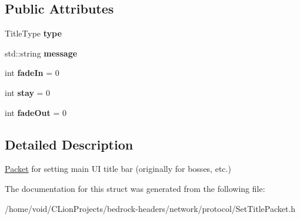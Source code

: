 \subsection*{Public Attributes}
\begin{DoxyCompactItemize}
\item 
\mbox{\label{struct_set_title_packet_a8e070bfe8f9b1b856bbdd45178c73c81}} 
Title\+Type {\bfseries type}
\item 
\mbox{\label{struct_set_title_packet_aec239a2eb87cc1b4674c650a0c1a2b12}} 
std\+::string {\bfseries message}
\item 
\mbox{\label{struct_set_title_packet_a2d535f93b746226d61a6a696f119b927}} 
int {\bfseries fade\+In} = 0
\item 
\mbox{\label{struct_set_title_packet_a77beaa7519b563e2b54475ea6687be53}} 
int {\bfseries stay} = 0
\item 
\mbox{\label{struct_set_title_packet_a263f4f1e30f041a46244f30ec8731381}} 
int {\bfseries fade\+Out} = 0
\end{DoxyCompactItemize}


\subsection{Detailed Description}
\mbox{\hyperlink{struct_packet}{Packet}} for setting main UI title bar (originally for bosses, etc.) 

The documentation for this struct was generated from the following file\+:\begin{DoxyCompactItemize}
\item 
/home/void/\+C\+Lion\+Projects/bedrock-\/headers/network/protocol/Set\+Title\+Packet.\+h\end{DoxyCompactItemize}
